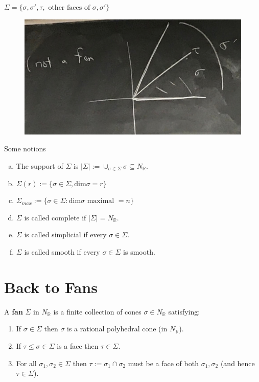 \documentclass[a4paper,12pt]{amsart}
\newcommand{\R}{\ensuremath{\mathbb{R}}}
\begin{document}
\begin{Eg}$\Sigma=\{\sigma, \sigma',\tau,\text{ other faces of }\sigma, \sigma'\}$
\begin{figure}[h!]\centering
	\includegraphics[scale=0.1]{pic/4}
\end{figure}
\end{Eg}
Some notions
\begin{enumerate}[a)]
	\item The support of $\Sigma$ is $|\Sigma|:=\cup_{\sigma\in\Sigma}\sigma \subseteq N_\R$.
	\item $\Sigma(r):=\{\sigma\in\Sigma, \text{dim}\sigma=r\}$
	\item $\Sigma_{max}:=\{\sigma \in \Sigma: \text{dim}\sigma\text{ maximal }= n\}$
	\item $ \Sigma $ is called complete if $|\Sigma|=N_\R$.
	\item $\Sigma$ is called simplicial if every $\sigma \in \Sigma$.
	\item $\Sigma$ is called smooth if every $\sigma\in \Sigma$ is smooth.
\end{enumerate}

\newpage
\section{Back to Fans}

\begin{Def}
	A {\bf fan} $\Sigma$ in $N_{\mathbb{R}}$ is a finite collection of cones $\sigma \in N_{\mathbb{R}}$ satisfying:
	\begin{enumerate}
		\item If $\sigma \in \Sigma$ then $\sigma$ is a rational polyhedral cone (in $N_{\mathbb{R}}$).
		\item If $\tau \leq \sigma \in \Sigma$ is a face then $\tau \in \Sigma$.
		\item For all $\sigma_1, \sigma_2 \in \Sigma$ then $\tau := \sigma_1 \cap \sigma_2$ must be a face of both $\sigma_1, \sigma_2$ (and hence $\tau \in \Sigma$).
	\end{enumerate}
\end{Def}
\end{document}
